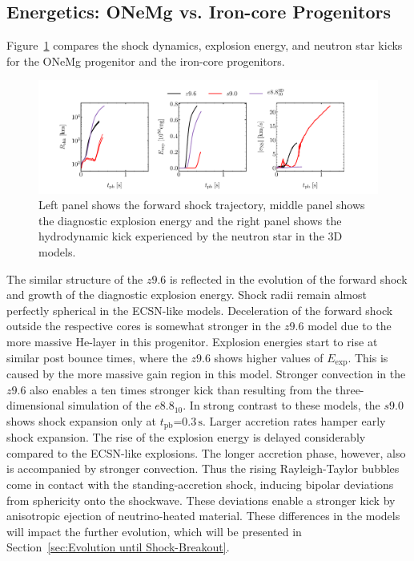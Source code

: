 \documentclass[fleqn,usenatbib]{mnras}
\newcommand{\tpb}{\ensuremath{t_{\text{pb}}}}
\renewcommand{\sec}{\xspace\ensuremath{\text{s}}}
\begin{document}
\subsection{Energetics: ONeMg vs. Iron-core Progenitors}
Figure~\ref{fig:eexp kick 3D} compares the shock dynamics, explosion energy, and neutron star kicks for the ONeMg progenitor and the iron-core progenitors.
\begin{figure}
 \centering
 \includegraphics[width=\textwidth,trim=0.5cm 0.2cm 0.5cm 0cm,clip]{pic/eexp_shk_kick_all_1d2d3d_paper.pdf}
 \caption{Left panel shows the forward shock trajectory, middle panel shows the diagnostic explosion energy and the right panel shows the hydrodynamic kick experienced by the neutron star in the 3D models. }
\label{fig:eexp kick 3D} 
\end{figure}
The similar structure of the $z9.6$ is reflected in the evolution of the forward shock and growth of the diagnostic explosion energy. Shock radii remain almost perfectly spherical in the ECSN-like models. Deceleration of the forward shock outside the respective cores is somewhat stronger in the $z9.6$ model due to the more massive He-layer in this progenitor. Explosion energies start to rise at similar post bounce times, where the $z9.6$ shows higher values of $E_{\mathrm{exp}}$. This is caused by the more massive gain region in this model. 
Stronger convection in the $z9.6$ also enables a ten times stronger kick than resulting from the three-dimensional simulation of the $e8.8_{10}$.
In strong contrast to these models, the $s9.0$ shows shock expansion only at $\tpb\mathord{=}0.3\,\sec$. Larger accretion rates hamper early shock expansion. The rise of the explosion energy is delayed considerably compared to the ECSN-like explosions. The longer accretion phase, however, also is accompanied by stronger convection. Thus the rising Rayleigh-Taylor bubbles come in contact with the standing-accretion shock, inducing bipolar deviations from sphericity onto the shockwave. These deviations enable a stronger kick by anisotropic ejection of neutrino-heated material. 
These differences in the models will impact the further evolution, which will be presented in Section~\ref{sec:Evolution until Shock-Breakout}.
\end{document}
